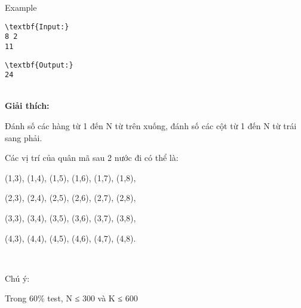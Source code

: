 Example
\begin{verbatim}
\textbf{Input:}
8 2
11\end{verbatim}
\begin{verbatim}
\textbf{Output:}
24\end{verbatim}


\\\textbf{​Giải thích:}

Đánh số các hàng từ 1 đến N từ trên xuống, đánh số các cột từ 1 đến N từ trái sang phải.

Các vị trí của quân mã sau 2 nước đi có thể là:

(1,3), (1,4), (1,5), (1,6), (1,7), (1,8),

(2,3), (2,4), (2,5), (2,6), (2,7), (2,8),

(3,3), (3,4), (3,5), (3,6), (3,7), (3,8),

(4,3), (4,4), (4,5), (4,6), (4,7), (4,8).

 

Chú ý:

Trong 60\% test, N ≤ 300 và K ≤ 600